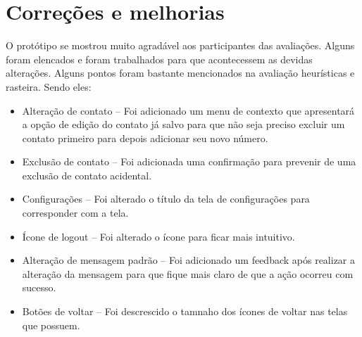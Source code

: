 \section{Correções e melhorias}
O protótipo se mostrou muito agradável aos participantes das avaliações. Alguns foram elencados e foram trabalhados para que acontecessem as devidas alterações. Alguns pontos foram bastante mencionados na avaliação heurísticas e rasteira. Sendo eles: 
\begin{itemize}
\item Alteração de contato – Foi adicionado um menu de contexto que apresentará a opção de edição do contato já salvo para que não seja preciso excluir um contato primeiro para depois adicionar seu novo número.
\item Exclusão de contato – Foi adicionada uma confirmação para prevenir de uma exclusão de contato acidental.
\item Configurações – Foi alterado o título da tela de configurações para corresponder com a tela.
\item Ícone de logout – Foi alterado o ícone para ficar mais intuitivo. 
\item Alteração de mensagem padrão – Foi adicionado um feedback após realizar a alteração da mensagem para que fique mais claro de que a ação ocorreu com sucesso.
\item Botões de voltar – Foi descrescido o tamnaho dos ícones de voltar nas telas que possuem.
\end{itemize}
 
